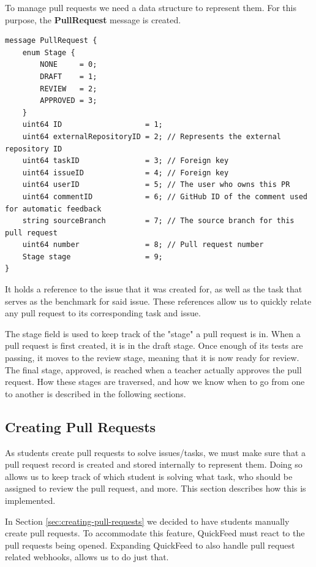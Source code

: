 To manage pull requests we need a data structure to represent them.
For this purpose, the \textbf{PullRequest} message is created.

\begin{lstlisting}[caption={PullRequest message}]
message PullRequest {
    enum Stage {
        NONE     = 0;
        DRAFT    = 1;
        REVIEW   = 2;
        APPROVED = 3;
    }
    uint64 ID                   = 1;
    uint64 externalRepositoryID = 2; // Represents the external repository ID
    uint64 taskID               = 3; // Foreign key
    uint64 issueID              = 4; // Foreign key
    uint64 userID               = 5; // The user who owns this PR
    uint64 commentID            = 6; // GitHub ID of the comment used for automatic feedback
    string sourceBranch         = 7; // The source branch for this pull request
    uint64 number               = 8; // Pull request number
    Stage stage                 = 9;
}
\end{lstlisting}

It holds a reference to the issue that it was created for, as well as the task that serves as the benchmark for said issue.
These references allow us to quickly relate any pull request to its corresponding task and issue.

The stage field is used to keep track of the "stage" a pull request is in.
When a pull request is first created, it is in the draft stage.
Once enough of its tests are passing, it moves to the review stage, meaning that it is now ready for review.
The final stage, approved, is reached when a teacher actually approves the pull request.
How these stages are traversed, and how we know when to go from one to another is described in the following sections.

\subsection{Creating Pull Requests}

As students create pull requests to solve issues/tasks, we must make sure that a pull request record is created and stored internally to represent them.
Doing so allows us to keep track of which student is solving what task, who should be assigned to review the pull request, and more.
This section describes how this is implemented.

In Section \ref{sec:creating-pull-requests} we decided to have students manually create pull requests.
To accommodate this feature, QuickFeed must react to the pull requests being opened.
Expanding QuickFeed to also handle pull request related webhooks, allows us to do just that.

